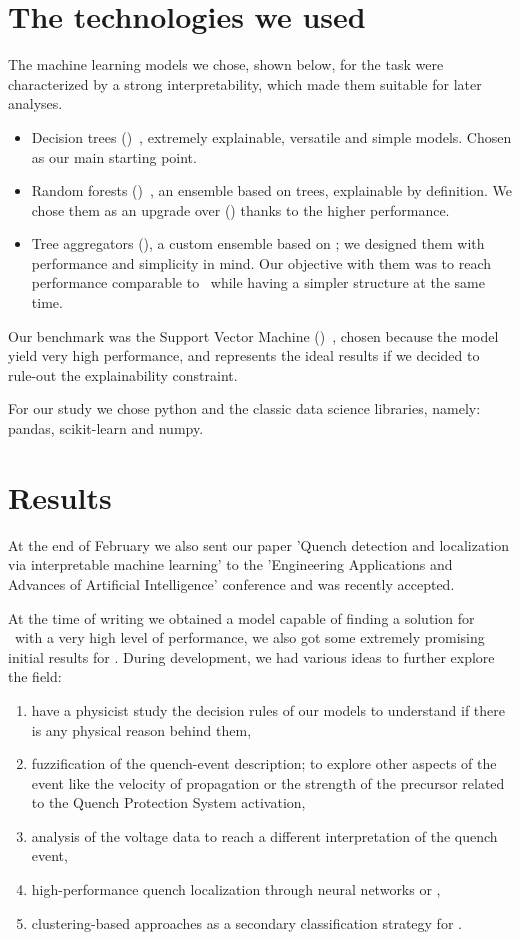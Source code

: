 \documentclass[a4paper, notitlepage]{article}
\begin{document}
\section{The technologies we used}
The machine learning models we chose, shown below, for the task were characterized by a strong
interpretability, which made them suitable for later analyses.
\begin{itemize}
	\item Decision trees (\dts)~\cite{breiman1984-dt}, extremely explainable, versatile and
	      simple models. Chosen as our main starting point.
	\item Random forests (\rfs)~\cite{breiman2001-rf}, an ensemble based on trees, explainable
	      by definition. We chose them as an upgrade over (\dts) thanks to the higher
	      performance.
	\item Tree aggregators (\tas), a custom ensemble based on \dts; we designed them with
	      performance and simplicity in mind. Our objective with them was to reach performance
	      comparable to \rfs\ while having a simpler structure at the same time.
\end{itemize}
Our benchmark was the Support Vector Machine (\svm)~\cite{cortes1995-svm}, chosen because the model yield very high
performance, and represents the ideal results if we decided to rule-out the explainability constraint.

For our study we chose python and the classic data science libraries, namely: pandas,
scikit-learn and numpy.

\section{Results}
At the end of February we also sent our paper 'Quench detection and localization via
interpretable machine learning' to the 'Engineering Applications and Advances of Artificial
Intelligence' conference and
was recently accepted.

At the time of writing we obtained a model capable of finding a solution for \qrp\ with a very
high level of performance, we also got some extremely promising initial results for \qlp. During
development, we had various ideas to further explore the field:
\begin{enumerate}
	\item have a physicist study the decision rules of our models to understand if there is
	      any physical reason behind them,
	\item fuzzification of the quench-event description; to explore other aspects of the event
	      like the velocity of propagation or the strength of the precursor related to the
	      Quench Protection System activation,
	\item analysis of the voltage data to reach a different interpretation of the quench event,
	\item high-performance quench localization through neural networks or \svcs,
	\item clustering-based approaches as a secondary classification strategy for \qlp.
\end{enumerate}
\end{document}
